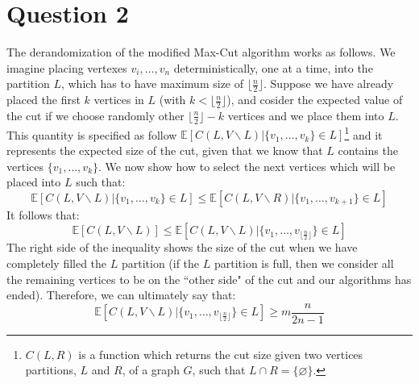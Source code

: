 \documentclass[11pt,a4paper]{article}
\newcommand{\floor}[1]{\lfloor #1 \rfloor}
\begin{document}
\section*{Question 2}

The derandomization of the modified Max-Cut algorithm works as follows. We imagine placing vertexes $v_i,\ldots,v_n$
deterministically, one at a time, into the partition $L$, which has to have maximum size of $\floor{\frac{n}{2}}$. 
Suppose we have already placed the first $k$ vertices in $L$ (with $k<\floor{\frac{n}{2}}$), and cosider the
expected value of the cut if we choose randomly other $\floor{\frac{n}{2}}-k$ vertices and we place them into $L$. This quantity is specified as follow $\mathbb{E}[C(L,V\backslash L)| \{v_1, \ldots, v_k\} \in L]$\footnote{$C(L,R)$ is a function which returns the cut size given two vertices partitions, $L$ and $R$, of a graph $G$, such that $L\cap R = \{\varnothing\}$.} and it represents the
expected size of the cut, given that we know that $L$ contains the vertices $\{v_1, \ldots, v_k\}$. We now show
how to select the next vertices which will be placed into $L$ such that:
\begin{equation}
\mathbb{E}[C(L,V\backslash L)| \{v_1, \ldots, v_k\} \in L] \leq \mathbb{E}[C(L,V\backslash R)| \{v_1, \ldots, v_{k+1}\} \in L]
\end{equation}
It follows that:
\begin{equation}
\mathbb{E}[C(L,V\backslash L)] \leq \mathbb{E}[C(L,V\backslash L)| \{v_1, \ldots, v_{\floor{\frac{n}{2}}}\} \in L]
\end{equation}
The right side of the inequality shows the size of the cut when we have completely filled the $L$ partition (if the $L$ partition is full, then we consider all the remaining vertices to be on the ``other side" of the cut and our algorithms has ended).
Therefore, we can ultimately say that:
\begin{equation}
\mathbb{E}[C(L,V\backslash L)| \{v_1, \ldots, v_{\floor{\frac{n}{2}}}\} \in L] \geq m \frac{n}{2n-1}
\end{equation}
\end{document}
